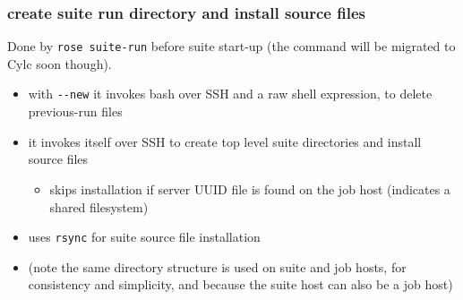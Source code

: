 
\renewcommand*\DTstylecomment{\normalfont\ttfamily\color{comments}}
\renewcommand*\DTstyle{\bf\ttfamily\textcolor{identifiers}}

\subsubsection{create suite run directory and install source files}

Done by \lstinline=rose suite-run= before suite start-up
(the command will be migrated to Cylc soon though).

\begin{itemize}
  \item with \lstinline=--new= it invokes bash over SSH and a raw shell
    expression, to delete previous-run files
  \item it invokes itself over SSH to create top level suite directories
    and install source files
    \begin{itemize}
      \item skips installation if server UUID file is found on the job host
        (indicates a shared filesystem)
    \end{itemize}
  \item uses \lstinline=rsync= for suite source file installation
  \item (note the same directory structure is used on suite and job hosts, for
    consistency and simplicity, and because the suite host can also be a job host)
\end{itemize}

\lstset{breaklines=true}
\lstset{language=jobhosts}


